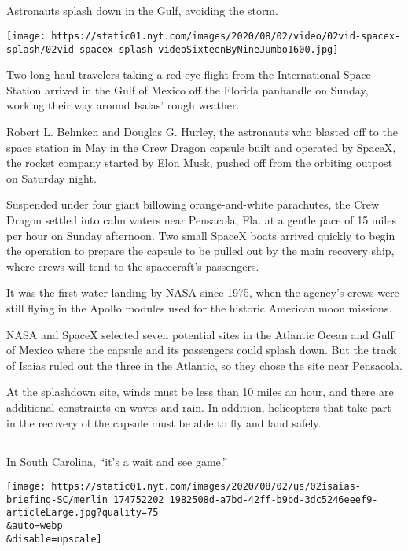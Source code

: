 \hypertarget{-1}{%
\subsection{}\label{-1}}

Astronauts splash down in the Gulf, avoiding the storm.

\texttt{[image: https://static01.nyt.com/images/2020/08/02/video/02vid-spacex-splash/02vid-spacex-splash-videoSixteenByNineJumbo1600.jpg]}

Two long-haul travelers taking a red-eye flight from the International
Space Station arrived in the Gulf of Mexico off the Florida panhandle on
Sunday, working their way around Isaias' rough weather.

Robert L. Behnken and Douglas G. Hurley, the astronauts who blasted off
to the space station in May in the Crew Dragon capsule built and
operated by SpaceX, the rocket company started by Elon Musk, pushed off
from the orbiting outpost on Saturday night.

Suspended under four giant billowing orange-and-white parachutes, the
Crew Dragon settled into calm waters near Pensacola, Fla. at a gentle
pace of 15 miles per hour on Sunday afternoon. Two small SpaceX boats
arrived quickly to begin the operation to prepare the capsule to be
pulled out by the main recovery ship, where crews will tend to the
spacecraft's passengers.

It was the first water landing by NASA since 1975, when the agency's
crews were still flying in the Apollo modules used for the historic
American moon missions.

NASA and SpaceX selected seven potential sites in the Atlantic Ocean and
Gulf of Mexico where the capsule and its passengers could splash down.
But the track of Isaias ruled out the three in the Atlantic, so they
chose the site near Pensacola.

At the splashdown site, winds must be less than 10 miles an hour, and
there are additional constraints on waves and rain. In addition,
helicopters that take part in the recovery of the capsule must be able
to fly and land safely.

\hypertarget{-2}{%
\subsection{}\label{-2}}

In South Carolina, ``it's a wait and see game.''

\texttt{[image: https://static01.nyt.com/images/2020/08/02/us/02isaias-briefing-SC/merlin\_174752202\_1982508d-a7bd-42ff-b9bd-3dc5246eeef9-articleLarge.jpg?quality=75\\\&auto=webp\\\&disable=upscale]}

